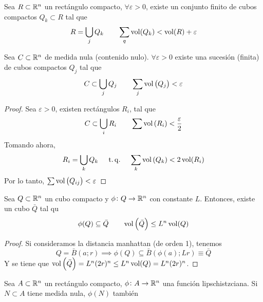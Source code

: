 \begin{lema}
    Sea $R \subset \mathbb{R}^n$ un rectángulo compacto, $\forall \varepsilon > 0$, existe un conjunto finito de cubos compactos $Q_k \subset R$ tal que
    \[
        R = \bigcup_{j} Q_k \qquad
        \sum_{q} \operatorname{vol}(Q_k) < \operatorname{vol}(R) + \varepsilon
    \]
\end{lema}

\begin{lema}
    Sea $C \subset \mathbb{R}^n$ de medida nula (contenido nulo). $\forall \varepsilon > 0$ existe una sucesión (finita) de cubos compactos $Q_j$ tal que
    \[
        C \subset \bigcup_{j} Q_j \qquad
        \sum_j \operatorname{vol}\left( Q_j \right) < \varepsilon
    \]
\end{lema}

\begin{proof}
    Sea $\varepsilon > 0$, existen rectángulos $R_i$, tal que
    \[
        C \subset \bigcup_i R_i \qquad
        \sum \operatorname{vol}\left( R_i \right) < \frac{\varepsilon}{2}
    \]
    Tomando ahora,
    \[
        R_i = \bigcup_k Q_k \quad \operatorname{\;t.q.\;} \quad
        \sum_k \operatorname{vol}\left( Q_k \right) < 2 \operatorname{vol}(R_i)
    \]
    Por lo tanto, $\sum \operatorname{vol}\left(Q_{ij}\right) < \varepsilon$
\end{proof}

\begin{lema}
    Sea $Q \subset \mathbb{R}^n$ un cubo compacto y $\phi \colon Q \to \mathbb{R}^n$ con constante $L$. Entonces, existe un cubo
    $\bar{Q}$ tal qu
    \[
        \phi(Q) \subseteq \bar{Q} \qquad
        \operatorname{vol}\left( \bar{Q} \right) \leq L^n \operatorname{vol}(Q)
    \]
\end{lema}

\begin{proof}
    Si consideramos la distancia manhattan (de orden 1), tenemos
    \[
        Q = \bar{B}(a;r) \implies \phi(Q) \subseteq \bar{B} \left( \phi(a); Lr \right) \equiv \bar{Q}
    \]
    Y se tiene que $\operatorname{vol}\left( \bar{Q} \right) = L^n (2r)^n \leq L^n \operatorname{vol}(Q) = L^n (2r)^n$.
\end{proof}

\begin{lema}
    Sea $A \subset \mathbb{R}^n$ un rectángulo compacto, $\phi \colon A \to \mathbb{R}^n$ una función lipschistzciana. Si $N \subset A$ tiene
    medida nula, $\phi(N)$ tambi\'en 
\end{lema}

